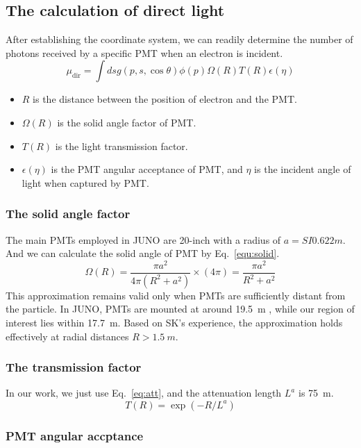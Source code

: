 \subsection{The calculation of direct light}
After establishing the coordinate system, we can readily determine the number of photons received by a specific PMT when an electron is incident.
\begin{equation}
	\mu_{\mathrm{dir}}=\int ds g(p,s,\cos\theta)\phi(p)\Omega(R)T(R)\epsilon(\eta)
	\label{equ:directLight}
\end{equation}
\begin{itemize}
	\item $R$ is the distance between the position of electron and the PMT.
	\item $\Omega(R)$ is the solid angle factor of PMT.
	\item $T(R)$ is the light transmission factor.
	\item $\epsilon(\eta)$ is the PMT angular acceptance of PMT, and $\eta$ is the incident angle of light when captured by PMT.
\end{itemize}

\subsubsection{The solid angle factor}
The main PMTs employed in JUNO are 20-inch with a radius of $a=SI{0.622}{m}$. And we can calculate the solid angle of PMT by Eq.~\eqref{equ:solid}.
\begin{equation}
	\Omega(R)=\frac{\pi a^2}{4\pi(R^2+a^2)}\times (4\pi)=\frac{\pi a^2}{R^2+a^2}
	\label{equ:solid}
\end{equation}
This approximation remains valid only when PMTs are sufficiently distant from the particle. In JUNO, PMTs are mounted at around \SI{19.5}{m} , while our region of interest lies within \SI{17.7}{m}. Based on SK's experience, the approximation holds effectively at radial distances $R > \SI{1.5}{m}$.

\subsubsection{The transmission factor}
In our work, we just use Eq.~\eqref{eq:att}, and the attenuation length $L^{a}$ is \SI{75}{m}.
\begin{equation}
	T(R) = \exp(-R/L^{a})
	\label{eq:att}
\end{equation}

\subsubsection{PMT angular accptance}



